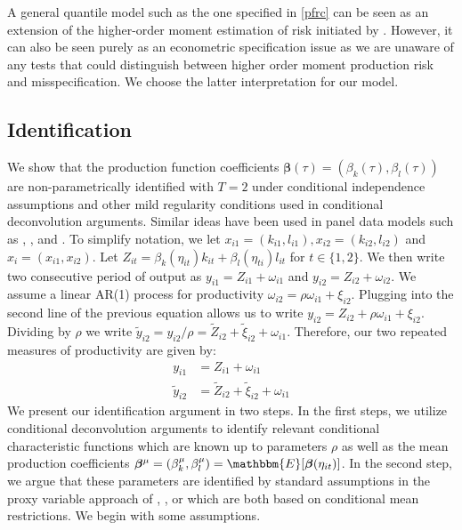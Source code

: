 \documentclass[11pt]{article}
\begin{document}
A general quantile model such as the one specified in \eqref{pfrc} can be seen as an extension of the higher-order moment estimation of risk initiated by \cite{Antle1983}. However, it can also be seen purely as an econometric specification issue as we are unaware of any tests that could distinguish between higher order moment production risk and misspecification. We choose the latter interpretation for our model. 

\subsection{Identification}

We show that the production function coefficients $\boldsymbol{\beta}(\tau)=(\beta_{k}(\tau), \beta_{l}(\tau))$ are non-parametrically identified with $T=2$ under conditional independence assumptions and other mild regularity conditions used in conditional deconvolution arguments. Similar ideas have been used in panel data models such as \cite{Canay2011}, \cite{Neumann2007}, and \cite{evdo2010}. To simplify notation, we let $x_{i1}=(k_{i1}, l_{i1}), x_{i2}=(k_{i2}, l_{i2})$ and $x_{i}=(x_{i1}, x_{i2})$. Let $Z_{it}=\beta_{k}(\eta_{it})k_{it}+\beta_{l}(\eta_{ti})l_{it}$ for $t\in\{1,2\}$. We then write two consecutive period of output as $y_{i1}=Z_{i1}+\omega_{i1}$ and $y_{i2}=Z_{i2}+\omega_{i2}$. We assume a linear AR(1) process for productivity $\omega_{i2}=\rho\omega_{i1}+\xi_{i2}$. Plugging into the second line of the previous equation allows us to write $y_{i2}=Z_{i2}+\rho\omega_{i1}+\xi_{i2}$. Dividing by $\rho$ we write $\tilde{y}_{i2}=y_{i2}/\rho=\tilde{Z}_{i2}+\tilde{\xi}_{i2}+\omega_{i1}$. Therefore, our two repeated measures of productivity are given by:
\begin{equation} \label{repeatedmeas}
\begin{split}
y_{i1}&=Z_{i1}+\omega_{i1}\\
\tilde{y}_{i2}&=\tilde{Z}_{i2}+\tilde{\xi}_{i2}+\omega_{i1}
\end{split}
\end{equation}
 We present our identification argument in two steps. In the first steps, we utilize conditional deconvolution arguments to identify relevant conditional characteristic functions which are known up to parameters $\rho$ as well as the mean production coefficients $\boldsymbol{\beta}^{\mu}=(\beta_{k}^{\mu}, \beta_{l}^{\mu})=\mathbbm{E}[\boldsymbol{\beta}(\eta_{it})]$. In the second step, we argue that these parameters are identified by standard assumptions in the proxy variable approach of \cite{Olley1996}, \cite{Levinsohn2003}, or \cite{Ackerberg2015} which are both based on conditional mean restrictions. We begin with some assumptions.
\end{document}
